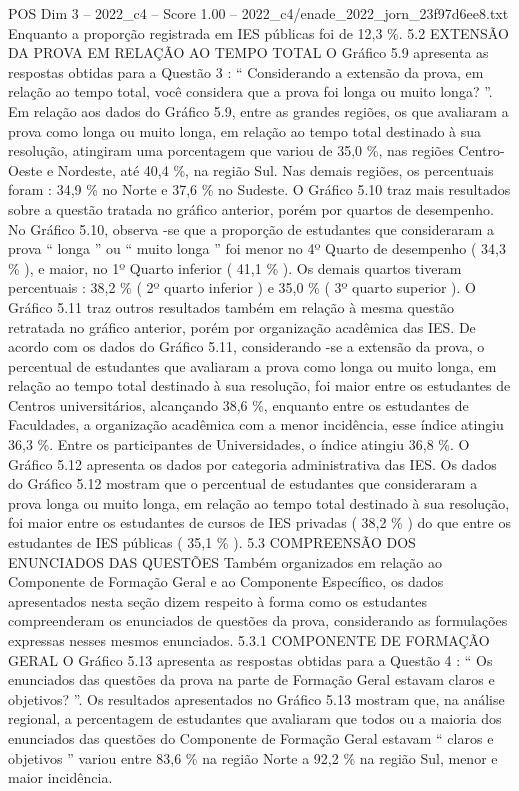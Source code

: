 \begin{textsample}{POS Dim 3 – 2022\_c4 – Score 1.00 – 2022\_c4/enade\_2022\_jorn\_23f97d6ee8.txt}
Enquanto a proporção registrada em IES públicas foi de 12,3 \%. 5.2 EXTENSÃO DA PROVA EM RELAÇÃO AO TEMPO TOTAL O Gráfico 5.9 apresenta as respostas obtidas para a Questão 3 : “ Considerando a extensão da prova, em relação ao tempo total, você considera que a prova foi longa ou muito longa? ”.
Em relação aos dados do Gráfico 5.9, entre as grandes regiões, os que avaliaram a prova como longa ou muito longa, em relação ao tempo total destinado à sua resolução, atingiram uma porcentagem que variou de 35,0 \%, nas regiões Centro-Oeste e Nordeste, até 40,4 \%, na região Sul.
Nas demais regiões, os percentuais foram : 34,9 \% no Norte e 37,6 \% no Sudeste.
O Gráfico 5.10 traz mais resultados sobre a questão tratada no gráfico anterior, porém por quartos de desempenho.
No Gráfico 5.10, observa -se que a proporção de estudantes que consideraram a prova “ longa ” ou “ muito longa ” foi menor no 4º Quarto de desempenho ( 34,3 \% ), e maior, no 1º Quarto inferior ( 41,1 \% ).
Os demais quartos tiveram percentuais : 38,2 \% ( 2º quarto inferior ) e 35,0 \% ( 3º quarto superior ).
O Gráfico 5.11 traz outros resultados também em relação à mesma questão retratada no gráfico anterior, porém por organização acadêmica das IES.
De acordo com os dados do Gráfico 5.11, considerando -se a extensão da prova, o percentual de estudantes que avaliaram a prova como longa ou muito longa, em relação ao tempo total destinado à sua resolução, foi maior entre os estudantes de Centros universitários, alcançando 38,6 \%, enquanto entre os estudantes de Faculdades, a organização acadêmica com a menor incidência, esse índice atingiu 36,3 \%.
Entre os participantes de Universidades, o índice atingiu 36,8 \%.
O Gráfico 5.12 apresenta os dados por categoria administrativa das IES.
Os dados do Gráfico 5.12 mostram que o percentual de estudantes que consideraram a prova longa ou muito longa, em relação ao tempo total destinado à sua resolução, foi maior entre os estudantes de cursos de IES privadas ( 38,2 \% ) do que entre os estudantes de IES públicas ( 35,1 \% ). 5.3 COMPREENSÃO DOS ENUNCIADOS DAS QUESTÕES Também organizados em relação ao Componente de Formação Geral e ao Componente Específico, os dados apresentados nesta seção dizem respeito à forma como os estudantes compreenderam os enunciados de questões da prova, considerando as formulações expressas nesses mesmos enunciados. 5.3.1 COMPONENTE DE FORMAÇÃO GERAL O Gráfico 5.13 apresenta as respostas obtidas para a Questão 4 : “ Os enunciados das questões da prova na parte de Formação Geral estavam claros e objetivos? ”.
Os resultados apresentados no Gráfico 5.13 mostram que, na análise regional, a percentagem de estudantes que avaliaram que todos ou a maioria dos enunciados das questões do Componente de Formação Geral estavam “ claros e objetivos ” variou entre 83,6 \% na região Norte a 92,2 \% na região Sul, menor e maior incidência.

\end{textsample}

